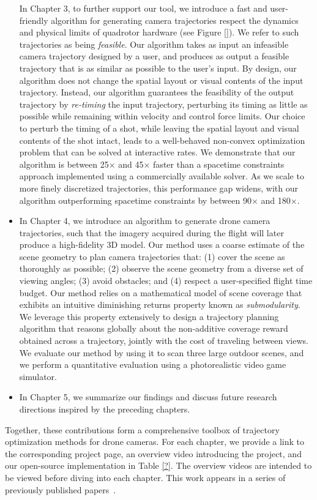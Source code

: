 \begin{itemize}
In Chapter 3, to further support our tool, we introduce a fast and user-friendly algorithm for generating camera trajectories respect the dynamics and physical limits of quadrotor hardware (see Figure \ref{}).
We refer to such trajectories as being \emph{feasible}.
Our algorithm takes as input an infeasible camera trajectory designed by a user, and produces as output a feasible trajectory that is as similar as possible to the user's input.
By design, our algorithm does not change the spatial layout or  visual contents of the input trajectory.
Instead, our algorithm guarantees the feasibility of the output trajectory by \emph{re-timing} the input trajectory, perturbing its timing as little as possible while remaining within velocity and control force limits.
Our choice to perturb the timing of a shot, while leaving the spatial layout and visual contents of the shot intact, leads to a well-behaved non-convex optimization problem that can be solved at interactive rates.
We demonstrate that our algorithm is between 25$\times$ and 45$\times$ faster than a spacetime constraints approach implemented using a commercially available solver.
As we scale to more finely discretized trajectories, this performance gap widens, with our algorithm outperforming spacetime constraints by between 90$\times$ and 180$\times$.

\item

In Chapter 4, we introduce an algorithm to generate drone camera trajectories, such that the imagery acquired during the flight will later produce a high-fidelity 3D model. Our method uses a coarse estimate of the scene geometry to plan camera trajectories that: (1) cover the scene as thoroughly as possible; (2) observe the scene geometry from a diverse set of viewing angles; (3) avoid obstacles; and (4) respect a user-specified flight time
budget. Our method relies on a mathematical model of scene coverage that exhibits an intuitive diminishing returns property known as \emph{submodularity}.
We leverage this property extensively to design a trajectory planning algorithm  that reasons globally about the non-additive coverage reward obtained across a trajectory, jointly with the cost of traveling between views.
We evaluate our method by using it to scan three large outdoor scenes, and we perform a quantitative evaluation using a photorealistic video game simulator.

\item

In Chapter 5, we summarize our findings and discuss future research directions inspired by the preceding chapters.

\end{itemize}

\noindent Together, these contributions form a comprehensive toolbox of trajectory optimization methods for drone cameras.
For each chapter, we provide a link to the corresponding project page, an overview video introducing the project, and our open-source implementation in Table \ref{?}.
The overview videos are intended to be viewed before diving into each chapter.
This work appears in a series of previously published papers~\cite{joubert:2015,roberts:2016,roberts:2016}.
